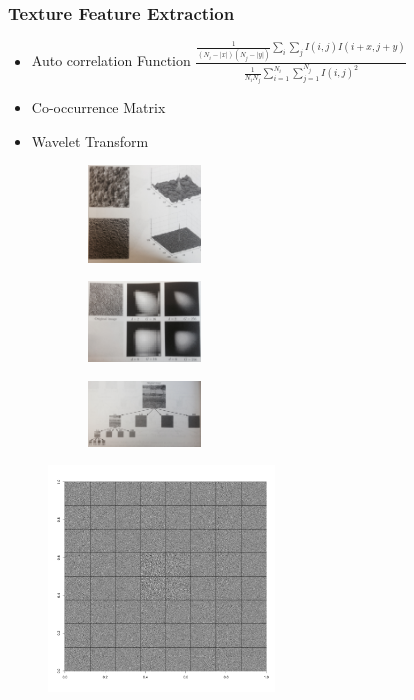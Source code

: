 \documentclass{beamer}
\begin{document}
\begin{frame}
  \frametitle{Texture Feature Extraction}

  \begin{itemize}
  \item Auto correlation Function $\frac{\frac{1}{(N_i - |x|)(N_j - |y|)}\sum_{i}\sum_{j}I(i,j)I(i+x,j+y)}{\frac{1}{N_iN_j}\sum_{i=1}^{N_i}\sum_{j=1}^{N_j}I(i,j)^2}$
\item Co-occurrence Matrix
\item Wavelet Transform 
  \end{itemize}

\begin{figure}[h]
        \centering
        \begin{subfigure}[b]{0.32\textwidth}
          \includegraphics[width=3cm]{acf2}
        \end{subfigure}
               \begin{subfigure}[b]{0.32\textwidth}
                \includegraphics[width=3cm]{coocc}
        \end{subfigure}
  \begin{subfigure}[b]{0.32\textwidth}
                \includegraphics[width=3cm]{wavtree}
        \end{subfigure}
 \end{figure}

\end{frame}








\begin{frame}
  \begin{figure}[h]
    \centering
    \includegraphics[width = 6cm]{test_64_}
  \end{figure}
\end{frame}
\end{document}
